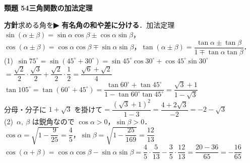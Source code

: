 \documentclass[a4paper,11pt]{ltjsarticle}
\newcommand{\ans}[2]{\Needspace{5\baselineskip}\vspace{6pt}%
  {\sffamily\bfseries 類題 #1\quad #2}\par}
\newcommand{\point}[1]{\textsf{\bfseries ▶ #1}}
\begin{document}
\ans{54}{三角関数の加法定理}
\begin{kai}
\textbf{方針}\quad 求める角を\point{有名角の和や差に分ける}．加法定理 $\sin(\alpha\pm\beta)=\sin\alpha\cos\beta\pm\cos\alpha\sin\beta$，$\cos(\alpha\pm\beta)=\cos\alpha\cos\beta\mp\sin\alpha\sin\beta$，$\tan(\alpha\pm\beta)=\dfrac{\tan\alpha\pm\tan\beta}{1\mp\tan\alpha\tan\beta}$．\\[2pt]
(1)\ $\sin75^\circ=\sin(45^\circ+30^\circ)=\sin45^\circ\cos30^\circ+\cos45^\circ\sin30^\circ$\\
\hspace*{1.5em}$=\dfrac{\sqrt2}2\cdot\dfrac{\sqrt3}2+\dfrac{\sqrt2}2\cdot\dfrac12=\dfrac{\sqrt6+\sqrt2}{4}$\\[2pt]
\hspace*{1.5em}$\tan105^\circ=\tan(60^\circ+45^\circ)=\dfrac{\tan60^\circ+\tan45^\circ}{1-\tan60^\circ\tan45^\circ}=\dfrac{\sqrt3+1}{1-\sqrt3}$\\[2pt]
\hspace*{1.5em}分母・分子に $1+\sqrt3$ を掛けて\quad $=\dfrac{(\sqrt3+1)^2}{1-3}=\dfrac{4+2\sqrt3}{-2}=-2-\sqrt3$\\[2pt]
(2)\ $\alpha,\ \beta$ は鋭角なので $\cos\alpha>0$，$\sin\beta>0$．\\
\hspace*{1.5em}$\cos\alpha=\sqrt{1-\dfrac{9}{25}}=\dfrac45$，\quad $\sin\beta=\sqrt{1-\dfrac{25}{169}}=\dfrac{12}{13}$\\
\hspace*{1.5em}$\cos(\alpha+\beta)=\cos\alpha\cos\beta-\sin\alpha\sin\beta=\dfrac45\cdot\dfrac5{13}-\dfrac35\cdot\dfrac{12}{13}=\dfrac{20-36}{65}=-\dfrac{16}{65}$
\end{kai}
\end{document}
